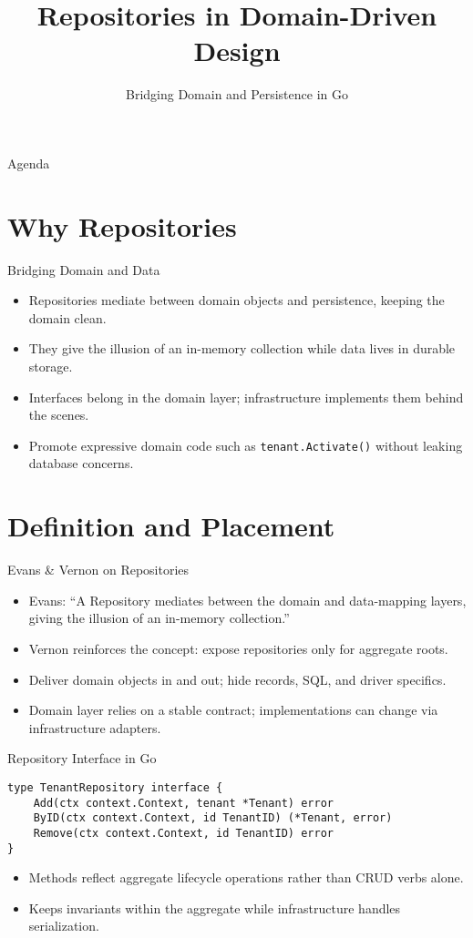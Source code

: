 \documentclass{beamer}
\title{Repositories in Domain-Driven Design}
\subtitle{Bridging Domain and Persistence in Go}
\author{}
\date{}
\begin{document}
\begin{frame}
  \titlepage
\end{frame}

\begin{frame}{Agenda}
  \tableofcontents
\end{frame}

\section{Why Repositories}

\begin{frame}{Bridging Domain and Data}
  \begin{itemize}
    \item Repositories mediate between domain objects and persistence, keeping the domain clean.
    \item They give the illusion of an in-memory collection while data lives in durable storage.
    \item Interfaces belong in the domain layer; infrastructure implements them behind the scenes.
    \item Promote expressive domain code such as \texttt{tenant.Activate()} without leaking database concerns.
  \end{itemize}
\end{frame}

\section{Definition and Placement}

\begin{frame}{Evans \& Vernon on Repositories}
  \begin{itemize}
    \item Evans: “A Repository mediates between the domain and data-mapping layers, giving the illusion of an in-memory collection.”
    \item Vernon reinforces the concept: expose repositories only for aggregate roots.
    \item Deliver domain objects in and out; hide records, SQL, and driver specifics.
    \item Domain layer relies on a stable contract; implementations can change via infrastructure adapters.
  \end{itemize}
\end{frame}

\begin{frame}[fragile]{Repository Interface in Go}
  \begin{lstlisting}
type TenantRepository interface {
    Add(ctx context.Context, tenant *Tenant) error
    ByID(ctx context.Context, id TenantID) (*Tenant, error)
    Remove(ctx context.Context, id TenantID) error
}
  \end{lstlisting}
  \begin{itemize}
    \item Methods reflect aggregate lifecycle operations rather than CRUD verbs alone.
    \item Keeps invariants within the aggregate while infrastructure handles serialization.
  \end{itemize}
\end{frame}
\end{document}
